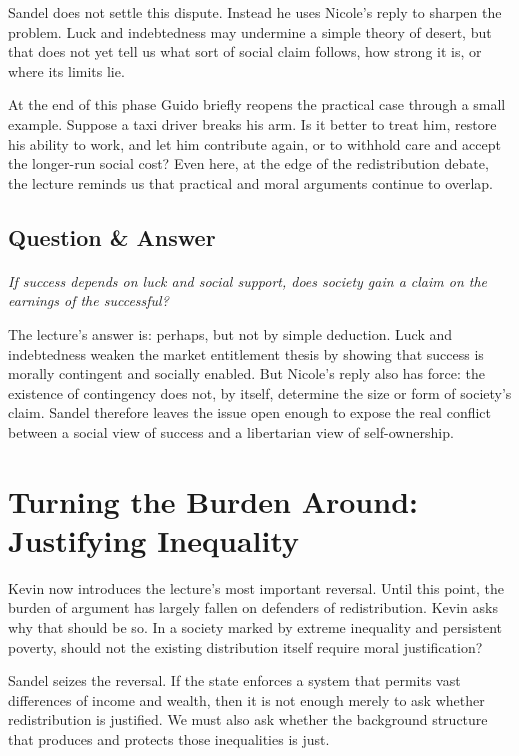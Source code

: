 Sandel does not settle this dispute. Instead he uses Nicole's reply to sharpen the problem. Luck and indebtedness may undermine a simple theory of desert, but that does not yet tell us what sort of social claim follows, how strong it is, or where its limits lie.

At the end of this phase Guido briefly reopens the practical case through a small example. Suppose a taxi driver breaks his arm. Is it better to treat him, restore his ability to work, and let him contribute again, or to withhold care and accept the longer-run social cost? Even here, at the edge of the redistribution debate, the lecture reminds us that practical and moral arguments continue to overlap.

\subsection{Question \& Answer}

\paragraph{}
\emph{If success depends on luck and social support, does society gain a claim on the earnings of the successful?}

The lecture's answer is: perhaps, but not by simple deduction. Luck and indebtedness weaken the market entitlement thesis by showing that success is morally contingent and socially enabled. But Nicole's reply also has force: the existence of contingency does not, by itself, determine the size or form of society's claim. Sandel therefore leaves the issue open enough to expose the real conflict between a social view of success and a libertarian view of self-ownership.

\section{Turning the Burden Around: Justifying Inequality}

Kevin now introduces the lecture's most important reversal. Until this point, the burden of argument has largely fallen on defenders of redistribution. Kevin asks why that should be so. In a society marked by extreme inequality and persistent poverty, should not the existing distribution itself require moral justification?

Sandel seizes the reversal. If the state enforces a system that permits vast differences of income and wealth, then it is not enough merely to ask whether redistribution is justified. We must also ask whether the background structure that produces and protects those inequalities is just.

